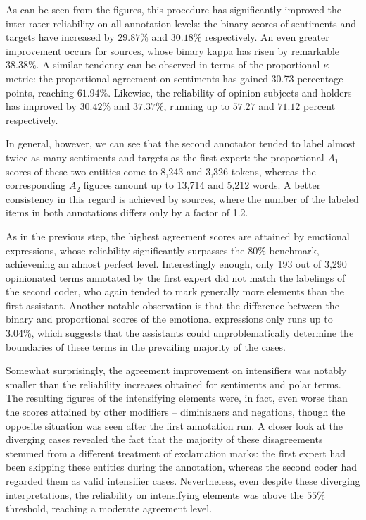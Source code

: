 As can be seen from the figures, this procedure has significantly
improved the inter-rater reliability on all annotation levels: the
binary scores of sentiments and targets have increased by $29.87\%$
and $30.18\%$ respectively.  An even greater improvement occurs for
sources, whose binary kappa has risen by remarkable $38.38\%$.  A
similar tendency can be observed in terms of the proportional
$\kappa$-metric: the proportional agreement on sentiments has gained
30.73 percentage points, reaching $61.94\%$.  Likewise, the
reliability of opinion subjects and holders has improved by $30.42\%$
and $37.37\%$, running up to $57.27$ and $71.12$ percent respectively.

In general, however, we can see that the second annotator tended to
label almost twice as many sentiments and targets as the first expert:
the proportional $A_1$ scores of these two entities come to 8,243 and
3,326 tokens, whereas the corresponding $A_2$ figures amount up to
13,714 and 5,212 words.  A better consistency in this regard is
achieved by sources, where the number of the labeled items in both
annotations differs only by a factor of 1.2.

As in the previous step, the highest agreement scores are attained by
emotional expressions, whose reliability significantly surpasses the
80\% benchmark, achievening an almost perfect level.  Interestingly
enough, only 193 out of 3,290 opinionated terms annotated by the first
expert did not match the labelings of the second coder, who again
tended to mark generally more elements than the first assistant.
Another notable observation is that the difference between the binary
and proportional scores of the emotional expressions only runs up to
3.04\%, which suggests that the assistants could unproblematically
determine the boundaries of these terms in the prevailing majority of
the cases.

Somewhat surprisingly, the agreement improvement on intensifiers was
notably smaller than the reliability increases obtained for sentiments
and polar terms.  The resulting figures of the intensifying elements
were, in fact, even worse than the scores attained by other modifiers
-- diminishers and negations, though the opposite situation was seen
after the first annotation run.  A closer look at the diverging cases
revealed the fact that the majority of these disagreements stemmed
from a different treatment of exclamation marks: the first expert had
been skipping these entities during the annotation, whereas the second
coder had regarded them as valid intensifier cases.  Nevertheless,
even despite these diverging interpretations, the reliability on
intensifying elements was above the $55\%$ threshold, reaching a
moderate agreement level.

